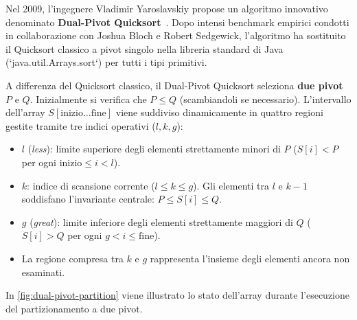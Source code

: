 Nel 2009, l'ingegnere Vladimir Yaroslavskiy propose un algoritmo innovativo denominato \textbf{Dual-Pivot Quicksort}~\cite{yaroslavskiy2009}. Dopo intensi benchmark empirici condotti in collaborazione con Joshua Bloch e Robert Sedgewick, l'algoritmo ha sostituito il Quicksort classico a pivot singolo nella libreria standard di Java (`java.util.Arrays.sort`) per tutti i tipi primitivi.

A differenza del Quicksort classico, il Dual-Pivot Quicksort seleziona \textbf{due pivot} $P$ e $Q$. Inizialmente si verifica che $P \le Q$ (scambiandoli se necessario). L'intervallo dell'array $S[\text{inizio} \dots \text{fine}]$ viene suddiviso dinamicamente in quattro regioni gestite tramite tre indici operativi ($l, k, g$):

\begin{itemize}
  \item $l$ (\textit{less}): limite superiore degli elementi strettamente minori di $P$ ($S[i] < P$ per ogni $\text{inizio} \le i < l$).
  \item $k$: indice di scansione corrente ($l \le k \le g$). Gli elementi tra $l$ e $k-1$ soddisfano l'invariante centrale: $P \le S[i] \le Q$.
  \item $g$ (\textit{great}): limite inferiore degli elementi strettamente maggiori di $Q$ ($S[i] > Q$ per ogni $g < i \le \text{fine}$).
  \item La regione compresa tra $k$ e $g$ rappresenta l'insieme degli elementi ancora non esaminati.
\end{itemize}

In \autoref{fig:dual-pivot-partition} viene illustrato lo stato dell'array durante l'esecuzione del partizionamento a due pivot.

